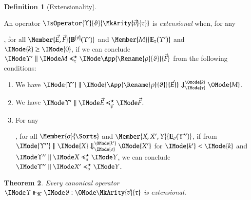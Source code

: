 \documentclass[11pt]{article}
\newtheorem{thm}{Theorem}[section]
\theoremstyle{definition}
\newtheorem{definition}[thm]{Definition}
\theoremstyle{notation}
\theoremstyle{remark}
\numberwithin{equation}{section}
\newcommand\EvalN[5]{\IMode{#1}\parallel\IMode{#4}\Downarrow^{\OMode{#3}}_{\IMode{#2}}\OMode{#5}}
\newcommand\Exprs{\mathbf{E}}
\newcommand\BTms{\mathbf{B}}
\begin{document}
\begin{definition}[Extensionality]
  \label{def:extensionality}

  An operator $\IsOperator{\Upsilon}{\vartheta}{\MkArity{\vec{v}}{\tau}}$ is
  \emph{extensional} when, for any
  , for all $\Member{\vec{E},\vec{F}}{\BTms^{[\vec{v}]}(\Upsilon')}$ and
  $\Member{M}{\Exprs_\tau(\Upsilon')}$ and $\IMode{k}\geq\IMode{0}$, if we can conclude
  $\SBinRel{\preccurlyeq^\star_\tau}{\Upsilon'}{M}{\App{\Rename{\rho}{\vartheta}}{\vec{F}}}$
  from the following conditions:
  \begin{enumerate}
    \item
      We have $\EvalN{\Upsilon'}{\tau}{k}{\App{\Rename{\rho}{\vartheta}}{\vec{E}}}{M}$.

    \item
      We have $\SBinRel{\preccurlyeq^\star_{\vec{v}}}{\Upsilon'}{\vec{E}}{\vec{F}}$.

    \item
      For any
      , for all $\Member{\sigma}{\Sorts}$ and $\Member{X,X',Y}{\Exprs_\sigma(\Upsilon'')}$, if
      from $\EvalN{\Upsilon''}{\sigma}{k'}{X}{X'}$ for $\IMode{k'}<\IMode{k}$ and
      $\SBinRel{\preccurlyeq^\star_\sigma}{\Upsilon''}{X}{Y}$, we can conclude
      $\SBinRel{\preccurlyeq^\star_\sigma}{\Upsilon''}{X'}{Y}$.
  \end{enumerate}

\end{definition}

\begin{thm}
  Every canonical operator
  $\IsCanOperator{\Upsilon}{\vartheta}{\MkArity{\vec{v}}{\tau}}$ is
  extensional.
\end{thm}
\end{document}
